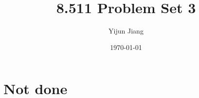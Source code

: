 \documentclass{article}
\title{8.511 Problem Set 3}
\author{Yijun Jiang}
\date{\today}
\begin{document}
\maketitle

\section{Not done}
\end{document}
